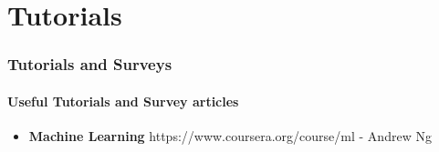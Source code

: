 \section{Tutorials}

\begin{frame}
    \frametitle{Tutorials and Surveys}
    \framesubtitle{Useful Tutorials and Survey articles}
    \begin{itemize}
    		\item \textbf{Machine Learning} https://www.coursera.org/course/ml - Andrew Ng
    		
    \end{itemize}
\end{frame}